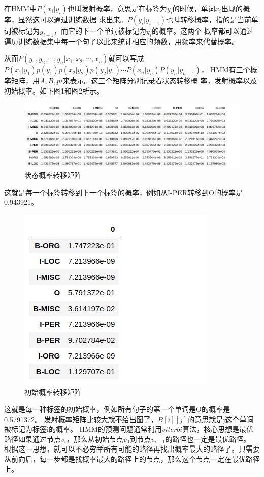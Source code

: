\documentclass[openany,oneside]{ctexbook}
\begin{document}
在HMM中$P(x_i|y_i)$也叫发射概率，意思是在标签为$y_i$的时候，单词$x_i$出现的概率，显然这可以通过训练数据
求出来。$P(y_i|y_{i-1})$也叫转移概率，指的是当前单词被标记为$y_{i-1}$，而它的下一个单词被标记为$y_i$的概率。这两个
概率都可以通过遍历训练数据集中每一个句子以此来统计相应的频数，用频率来代替概率。

从而$P(y_1,y_2,\cdots, y_n|x_1,x_2,\cdots,x_n)$就可以写成$P(x_1|y_1)p(y_1)p(x_2|y_2)p(y_2|y_1)\cdots P(x_n|y_n)P(y_n|y_{n-1})$，
HMM有三个概率矩阵，用$A,B,pi$来表示。这三个矩阵分别记录着状态转移概
率，发射概率以及初始概率。如下图1和图2所示。

\begin{figure}[htp]
   \centering
   \includegraphics[scale=0.5]{A.png}
   \caption{状态概率转移矩阵}
\end{figure}
这就是每一个标签转移到下一个标签的概率，例如从I-PER转移到O的概率是0.943921。
\begin{figure}[htp]
   \centering
   \includegraphics[scale=0.6]{pi.png}
   \caption{初始概率转移矩阵}
\end{figure}
这就是每一种标签的初始概率，例如所有句子的第一个单词是O的概率是0.5791372。
发射概率矩阵比较大就不给出图了，$B[i][j]$的意思就是j这个单词被标记为标签i的概率。
HMM的预测问题通常利用$viterbi$算法，核心思想是最优路径如果通过节点$v_i$，那么从初始节点$v_0$到节点$v_{i-1}$的路径也一定是最优路径。
根据这一思想，就可以不必穷举所有可能的路径再找出概率最大的路径了。只需要从前向后，每一步都是找概率最大的路径上的节点，那么这个节点一定在最优路径上。
\end{document}
